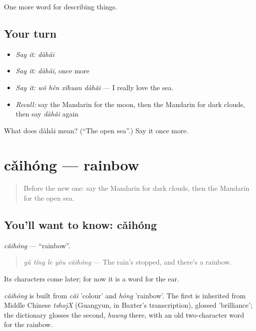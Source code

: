 \begin{grammarlens}[title={What you've built}]
One more word for describing things.
\end{grammarlens}

\subsection*{Your turn}
\begin{itemize}
\raggedright
  \item \emph{Say it:} \emph{dàhǎi}
  \item \emph{Say it:} \emph{dàhǎi}, once more
  \item \emph{Say it:} \emph{wǒ hěn xǐhuan dàhǎi} — I really love the sea.
  \item \emph{Recall:} say the Mandarin for the moon, then the Mandarin for dark clouds, then say \emph{dàhǎi} again
\end{itemize}

\begin{tcolorbox}[breakable,colback=teal!4,colframe=teal!35!black,title={Before you move on}]
What does dàhǎi mean? (\textquotedblleft{}The open sea\textquotedblright{}.) Say it once more.
\end{tcolorbox}
\section[cǎihóng]{cǎihóng — rainbow}

\label{lesson:ZH-C238-caihong}



\begin{quote}
Before the new one: say the Mandarin for dark clouds, then the Mandarin for the open sea.
\end{quote}

\subsection*{You'll want to know: cǎihóng}
\emph{cǎihóng} — \textquotedblleft{}rainbow\textquotedblright{}.

\begin{quote}
\emph{yǔ tíng le yǒu cǎihóng} — The rain's stopped, and there's a rainbow.
\end{quote}

Its characters come later; for now it is a word for the ear.

\begin{cousinweb}
\emph{cǎihóng} is built from \emph{cǎi} 'colour' and \emph{hóng} 'rainbow'. The first is inherited from Middle Chinese \emph{tshojX} (Guangyun, in Baxter's transcription), glossed 'brilliance'; the dictionary glosses the second, \emph{huwng} there, with an old two-character word for the rainbow.
\end{cousinweb}

